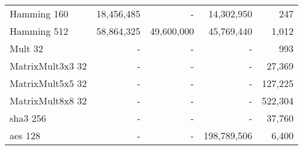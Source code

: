 \begin{table}
\begin{tabular}{l||r|r|r||r}
Hamming 160      & 18,456,485                                                & -                                                      & 14,302,950                                                       & 247                                                  \\
Hamming 512      & 58,864,325                                                & 49,600,000                                             & 45,769,440                                                       & 1,012                                                \\ \hline
Mult 32          & -                                                         & -                                                      & -                                                                & 993                                                  \\ \hline
MatrixMult3x3 32 & -                                                         & -                                                      & -                                                                & 27,369                                               \\
MatrixMult5x5 32 & -                                                         & -                                                      & -                                                                & 127,225                                              \\
MatrixMult8x8 32 & -                                                         & -                                                      & -                                                                & 522,304                                              \\ \hline
\acrshort{sha}3 256         & -                                                         & -                                                      & -                                                                & 37,760                                               \\ \hline
\acrshort{aes} 128          & -                                                         & -                                                      & 198,789,506                                                      & 6,400
\end{tabular}
\end{table}

